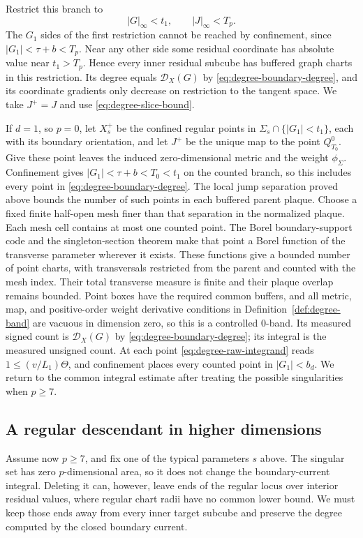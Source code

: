 Restrict this branch to
\[
                   |G|_\infty<t_1,\qquad |J|_\infty<T_p.
\]
The $G_1$ sides of the first restriction cannot be reached by confinement,
since $|G_1|<\tau+b<T_p$.  Near any other side some residual coordinate
has absolute value near $t_1>T_p$.  Hence every inner residual subcube
has buffered graph charts in this restriction.  Its degree equals
$\mathcal D_X(G)$ by \eqref{eq:degree-boundary-degree}, and its coordinate gradients only
decrease on restriction to the tangent space.  We take $J^+=J$ and use
\eqref{eq:degree-slice-bound}.

If $d=1$, so $p=0$, let $X_s^+$ be the confined regular points in
$\Sigma_s\cap\{|G_1|<t_1\}$, each with its boundary orientation, and let
$J^+$ be the unique map to the point $Q_{T_0}^0$.  Give these point leaves
the induced zero-dimensional metric and the weight $\phi_\Sigma$.
Confinement gives $|G_1|<\tau+b<T_0<t_1$ on the counted branch, so this
includes every point in \eqref{eq:degree-boundary-degree}.
The local jump separation proved above bounds the number of such points
in each buffered parent plaque.  Choose a fixed finite half-open mesh
finer than that separation in the normalized plaque.  Each mesh cell
contains at most one counted point.  The Borel boundary-support code and
the singleton-section theorem make that point a Borel function of the
transverse parameter wherever it exists.  These functions give a bounded
number of point charts, with transversals restricted from the parent and
counted with the mesh index.  Their total transverse measure is finite and their
plaque overlap remains bounded.  Point boxes have the required common
buffers, and all metric, map, and positive-order
weight derivative conditions in Definition~\ref{def:degree-band} are
vacuous in dimension zero, so this is a controlled $0$-band.  Its measured
signed count is $\mathcal D_X(G)$ by
\eqref{eq:degree-boundary-degree}; its integral is the measured unsigned
count.  At each point \eqref{eq:degree-raw-integrand} reads
$1\le(v/L_1)\Theta$, and confinement places every counted point in
$|G_1|<b_d$.  We return to the common integral estimate after treating
the possible singularities when $p\ge7$.

\subsection{A regular descendant in higher dimensions}

Assume now $p\ge7$, and fix one of the typical parameters $s$ above.
The singular set has zero $p$-dimensional area, so it does not change the
boundary-current integral.  Deleting it can, however, leave ends of the
regular locus over interior residual values, where regular chart radii
have no common lower bound.  We must keep those ends away from every
inner target subcube and preserve the degree computed by the closed
boundary current.

